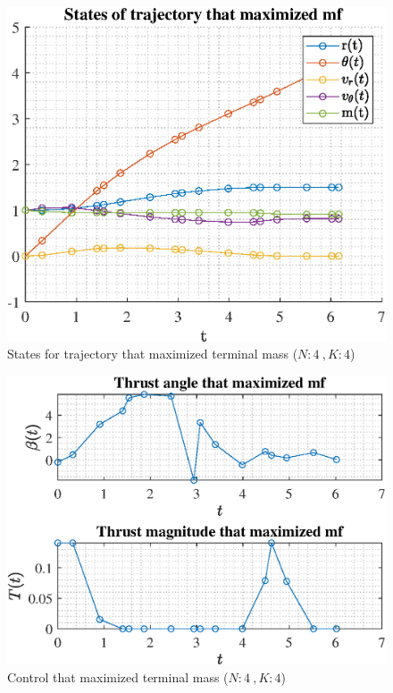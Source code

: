 \documentclass[]{article}
\begin{document}
	\begin{figure}
		\centering
		\includegraphics[scale=0.75]{states_N4_K4_C3_mf.eps}
		\caption{States for trajectory that maximized terminal mass (\(N:4\ , K:4\))}
		\label{fig:states_N4_K4_C3_mf}
	\end{figure}
	\begin{figure}
		\centering
		\includegraphics[scale=0.75]{control_N4_K4_C3_mf.eps}
		\caption{Control that maximized terminal mass (\(N:4\ , K:4\))}
		\label{fig:control_N4_K4_C3_mf}
	\end{figure}
\end{document}
